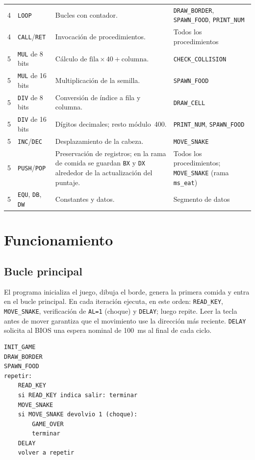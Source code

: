 \documentclass[10pt]{article}
\begin{document}
\begin{longtable}{@{}p{1.6cm}p{3.2cm}p{4.6cm}p{3.6cm}@{}}
4 & \texttt{LOOP} & Bucles con contador. & \texttt{DRAW\_BORDER}, \texttt{SPAWN\_FOOD}, \texttt{PRINT\_NUM} \\
4 & \texttt{CALL}/\texttt{RET} & Invocación de procedimientos. & Todos los procedimientos \\
5 & \texttt{MUL} de 8 bits & Cálculo de $\text{fila}\times 40+\text{columna}$. & \texttt{CHECK\_COLLISION} \\
5 & \texttt{MUL} de 16 bits & Multiplicación de la semilla. & \texttt{SPAWN\_FOOD} \\
5 & \texttt{DIV} de 8 bits & Conversión de índice a fila y columna. & \texttt{DRAW\_CELL} \\
5 & \texttt{DIV} de 16 bits & Dígitos decimales; resto módulo~400. & \texttt{PRINT\_NUM}, \texttt{SPAWN\_FOOD} \\
5 & \texttt{INC}/\texttt{DEC} & Desplazamiento de la cabeza. & \texttt{MOVE\_SNAKE} \\
5 & \texttt{PUSH}/\texttt{POP} & Preservación de registros; en la rama de comida se guardan \texttt{BX} y \texttt{DX} alrededor de la actualización del puntaje. & Todos los procedimientos; \texttt{MOVE\_SNAKE} (rama \texttt{ms\_eat}) \\
5 & \texttt{EQU}, \texttt{DB}, \texttt{DW} & Constantes y datos. & Segmento de datos \\
\end{longtable}

\section{Funcionamiento}

\subsection{Bucle principal}\label{sec:bucle}
El programa inicializa el juego, dibuja el borde, genera la primera comida y entra en el bucle principal. En cada iteración ejecuta, en este orden: \texttt{READ\_KEY}, \texttt{MOVE\_SNAKE}, verificación de \texttt{AL=1} (choque) y \texttt{DELAY}; luego repite. Leer la tecla antes de mover garantiza que el movimiento use la dirección más reciente. \texttt{DELAY} solicita al BIOS una espera nominal de 100~ms al final de cada ciclo.

\begin{lstlisting}[language={},caption={Bucle principal (pseudocódigo).},label={lst:bucle}]
INIT_GAME
DRAW_BORDER
SPAWN_FOOD
repetir:
    READ_KEY
    si READ_KEY indica salir: terminar
    MOVE_SNAKE
    si MOVE_SNAKE devolvio 1 (choque):
        GAME_OVER
        terminar
    DELAY
    volver a repetir
\end{lstlisting}
\end{document}
